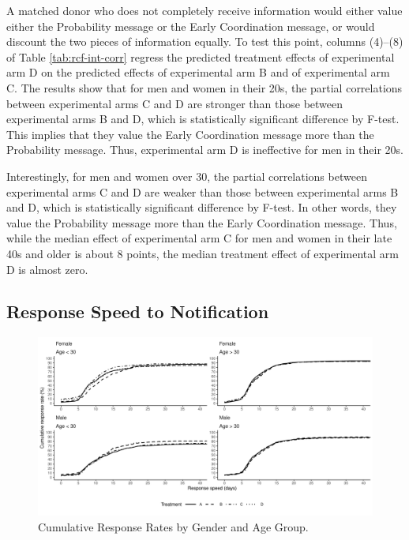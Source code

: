 \documentclass[
]{article}
\begin{document}
A matched donor who does not completely receive information would either value either the Probability message or the Early Coordination message, or would discount the two pieces of information equally. To test this point, columns (4)--(8) of Table \ref{tab:rcf-int-corr} regress the predicted treatment effects of experimental arm D on the predicted effects of experimental arm B and of experimental arm C. The results show that for men and women in their 20s, the partial correlations between experimental arms C and D are stronger than those between experimental arms B and D, which is statistically significant difference by F-test. This implies that they value the Early Coordination message more than the Probability message. Thus, experimental arm D is ineffective for men in their 20s.

Interestingly, for men and women over 30, the partial correlations between experimental arms C and D are weaker than those between experimental arms B and D, which is statistically significant difference by F-test. In other words, they value the Probability message more than the Early Coordination message. Thus, while the median effect of experimental arm C for men and women in their late 40s and older is about 8 points, the median treatment effect of experimental arm D is almost zero.

\hypertarget{reply-speed}{%
\subsection{Response Speed to Notification}\label{reply-speed}}

\begin{figure}[t]
\includegraphics{body_files/figure-latex/cumulative-response-rate-1} \caption{Cumulative Response Rates by Gender and Age Group.}\label{fig:cumulative-response-rate}
\end{figure}
\end{document}
